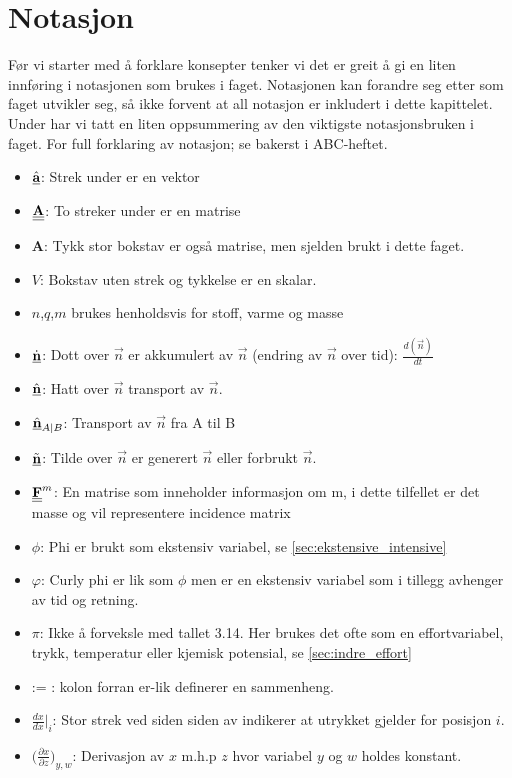 \clearpage
\section{Notasjon}\label{sec:notasjon}

Før vi starter med å forklare konsepter tenker vi det er greit å gi en liten innføring i notasjonen som brukes i faget. Notasjonen kan forandre seg etter som faget utvikler seg, så ikke forvent at all notasjon er inkludert i dette kapittelet. Under har vi tatt en liten oppsummering av den viktigste notasjonsbruken i faget. For full forklaring av notasjon; se bakerst i ABC-heftet.

\begin{itemize}
    \item $\underline{\hat{\textbf{a}}}$: Strek under er en vektor
    \item $\underline{\underline{\textbf{A}}}$: To streker under er en matrise
    \item $\textbf{A}$: Tykk stor bokstav er også matrise, men sjelden brukt i dette faget.
    \item $V$: Bokstav uten strek og tykkelse er en skalar.
    \item $n$,$q$,$m$ brukes henholdsvis for stoff, varme og masse
    \item $\underline{\dot{\textbf{n}}}$: Dott over $\vec{n}$ er akkumulert av $\vec{n}$ (endring av $\vec{n}$ over tid): $\frac{d(\vec{n})}{dt}$
    \item $\underline{\hat{\textbf{n}}}$: Hatt over $\vec{n}$ transport av $\vec{n}$.
    \item $\underline{\hat{\textbf{n}}}_{A|B}$: Transport av $\vec{n}$ fra A til B
    \item $\underline{\Tilde{\textbf{n}}}$: Tilde over $\vec{n}$ er generert $\vec{n}$ eller forbrukt $\vec{n}$.  
    \item $\underline{\underline{\textbf{F}}}^m$: En matrise som inneholder informasjon om m, i dette tilfellet er det masse og vil representere incidence matrix 
    \item \textbf{$\phi$}: Phi er brukt som ekstensiv variabel, se \cref{sec:ekstensive_intensive}
    \item \textbf{$\varphi$}: Curly phi er lik som $\phi$ men er en ekstensiv variabel som i tillegg avhenger av tid og retning. 
    \item \textbf{$\pi$}: Ikke å forveksle med tallet 3.14. Her brukes det ofte som en effortvariabel, trykk, temperatur eller kjemisk potensial, se \cref{sec:indre_effort} 
    \item := : kolon forran er-lik definerer en sammenheng.
    \item $\frac{dx}{dx}\Big|_i$: Stor strek ved siden siden av indikerer at utrykket gjelder for posisjon $i$.
    \item $\Big(\frac{\partial x}{\partial z}\Big)_{y,w}$: Derivasjon av $x$ m.h.p $z$ hvor variabel $y$ og $w$ holdes konstant.
\end{itemize}

\clearpage
